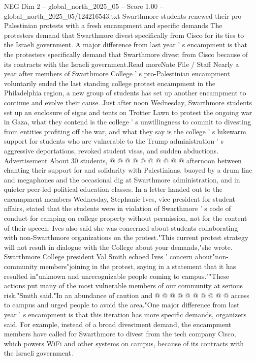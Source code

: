 \begin{textsample}{NEG Dim 2 – global\_north\_2025\_05 – Score 1.00 – global\_north\_2025\_05/124216543.txt}  \label{ex:f2_neg_043}
Swarthmore students renewed their pro-Palestinian protests with a fresh encampment and specific demands The protesters demand that Swarthmore divest specifically from Cisco for its ties to the Israeli government.
A major difference from last year ' s encampment is that the protesters specifically demand that Swarthmore divest from Cisco because of its contracts with the Israeli government.Read moreNate File / Staff Nearly a year after members of Swarthmore College ' s pro-Palestinian encampment voluntarily ended the last standing college protest encampment in the Philadelphia region, a new group of students has set up another encampment to continue and evolve their cause.
Just after noon Wednesday, Swarthmore students set up an enclosure of signs and tents on Trotter Lawn to protest the ongoing war in Gaza, what they contend is the college ' s unwillingness to commit to divesting from entities profiting off the war, and what they say is the college ' s lukewarm support for students who are vulnerable to the Trump administration ' s aggressive deportations, revoked student visas, and sudden abductions.
Advertisement About 30 students, @ @ @ @ @ @ @ @ @ @ afternoon between chanting their support for and solidarity with Palestinians, buoyed by a drum line and megaphones and the occasional dig at Swarthmore administration, and in quieter peer-led political education classes.
In a letter handed out to the encampment members Wednesday, Stephanie Ives, vice president for student affairs, stated that the students were in violation of Swarthmore ' s code of conduct for camping on college property without permission, not for the content of their speech.
Ives also said she was concerned about students collaborating with non-Swarthmore organizations on the protest."This current protest strategy will not result in dialogue with the College about your demands,"she wrote.
Swarthmore College president Val Smith echoed Ives ' concern about"non-community members"joining in the protest, saying in a statement that it has resulted in"unknown and unrecognizable people coming to campus.""These actions put many of the most vulnerable members of our community at serious risk,"Smith said."In an abundance of caution and @ @ @ @ @ @ @ @ @ @ access to campus and urged people to avoid the area."One major difference from last year ' s encampment is that this iteration has more specific demands, organizers said.
For example, instead of a broad divestment demand, the encampment members have called for Swarthmore to divest from the tech company Cisco, which powers WiFi and other systems on campus, because of its contracts with the Israeli government.

\end{textsample}
